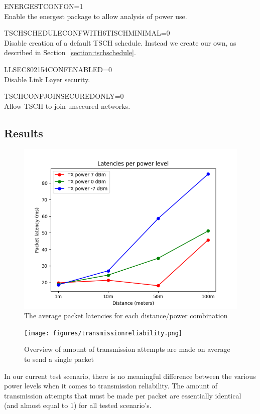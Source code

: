 \documentclass[conference]{IEEEtran}
\newcommand{\secref}[1]{Section~\ref{#1}}
\renewcommand\_{\textunderscore\allowbreak}
\begin{document}
\label{section:preprocessdef}
\begin{itemize}
{
\small
\item ENERGEST\_CONF\_ON=1\\ Enable the energest package to allow analysis of power use. 
\item TSCH\_SCHEDULE\_CONF\_WITH\_6TISCH\_MINIMAL=0\\ Disable creation of a default TSCH schedule. Instead we create our own, as described in \secref{section:tschschedule}.
\item LLSEC802154\_CONF\_ENABLED=0\\ Disable Link Layer security.
\item TSCH\_CONF\_JOIN\_SECURED\_ONLY=0\\ Allow TSCH to join unsecured networks.
}
\end{itemize}



\subsection{Results}

\begin{figure}[htbp]
	\centering
	\includegraphics[width=.48\textwidth,keepaspectratio]{figures/latencies.png}
	\caption{The average packet latencies for each distance/power combination}
	\label{fig:averagelatencies}
\end{figure}
\begin{figure}[htbp]
	\centering
	\texttt{[image: figures/transmission\_reliability.png]}
	\caption{Overview of amount of transmission attempts are made on average to send a single packet}
	\label{fig:txattempts}
\end{figure}

In our current test scenario, there is no meaningful difference between the various power levels when it comes to transmission reliability. The amount of transmission attempts that must be made per packet are essentially identical (and almost equal to 1) for all tested scenario's. 
\end{document}
